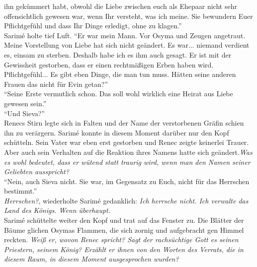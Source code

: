 ihn gekümmert habt, obwohl die Liebe zwischen euch als Ehepaar nicht sehr offensichtlich gewesen 
war, wenn Ihr versteht, was ich meine. Sie bewundern Euer Pflichtgefühl und dass Ihr Dinge 
erledigt, ohne zu klagen.''\\
Sarimé holte tief Luft. ``Er war mein Mann. Vor Osyma und Zeugen angetraut. Meine Vorstellung von 
Liebe hat sich nicht geändert. Es war... niemand verdient es, einsam zu sterben. Deshalb habe ich 
es ihm auch gesagt. Er ist mit der Gewissheit gestorben, dass er einen rechtmäßigen Erben haben 
wird. Pflichtgefühl... Es gibt eben Dinge, die man tun muss. Hätten seine anderen Frauen das nicht 
für Evin getan?''\\
``Seine Erste vermutlich schon. Das soll wohl wirklich eine Heirat aus Liebe gewesen sein.''\\
``Und Sieva?''\\
Renecs Stirn legte sich in Falten und der Name der verstorbenen Gräfin schien ihn zu verärgern. 
Sarimé konnte in diesem Moment darüber nur den Kopf schütteln. Sein Vater war eben erst gestorben 
und Renec zeigte keinerlei Trauer. Aber auch sein Verhalten auf die Reaktion ihres Namens hatte 
sich geändert.\textit{Was es wohl bedeutet, dass er wütend statt traurig wird, wenn man den Namen 
seiner Geliebten ausspricht?}\\
``Nein, auch Sieva nicht. Sie war, im Gegensatz zu Euch, nicht für das Herrschen bestimmt.''\\
\textit{Herrschen?}, wiederholte Sarimé gedanklich: \textit{Ich herrsche nicht. Ich verwalte das 
Land des Königs. Wenn überhaupt.}\\
Sarimé schüttelte weiter den Kopf und trat auf das Fenster zu. Die Blätter der Bäume glichen Osymas 
Flammen, die sich zornig und aufgebracht gen Himmel reckten. \textit{Weiß er, wovon Renec spricht? 
Sagt der rachsüchtige Gott es seinen Priestern, seinem König? Erzählt er ihnen von den Worten des 
Verrats, die in diesem Raum, in diesem Moment ausgesprochen wurden?}\\

